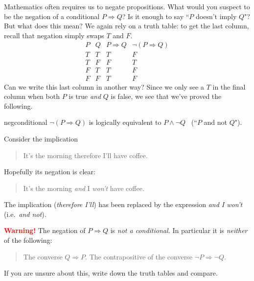  

Mathematics often requires us to negate propositions. What would you suspect to be the negation of a conditional $P\Longrightarrow Q$? Is it enough to say ``$P$ doesn't imply $Q$"? But what does this mean? We again rely on a truth table: to get the last column, recall that negation simply swaps $T$ and $F$.
\[
	\begin{array}{cc|c|c}
		P & Q & P\Longrightarrow Q & \neg(P\Longrightarrow Q)\\\hline
		T & T & T & F\\
		T & F & F & T\\
		F & T & T & F\\
		F & F & T & F
	\end{array}
\]
Can we write this last column in another way? Since we only see a $T$ in the final column when both $P$ is true \emph{and} $Q$ is false, we see that we've proved the following.

\begin{thm}{}{negconditional}
	$\neg(P\Longrightarrow Q)$ is logically equivalent to $P\wedge\neg Q$ \ (``$P$ and not $Q$").
\end{thm}


\begin{example}{}{}
	Consider the implication
	\begin{quote}
	  It's the morning therefore I'll have coffee.
	\end{quote}
	Hopefully its negation is clear:
	\begin{quote}
	  It's the morning \emph{and} I \emph{won't} have coffee.
	\end{quote}
	The implication (\emph{therefore I'll}) has been replaced by the expression \emph{and I won't} (i.e.\ \emph{and not}).
\end{example}

\begin{tcolorbox}
{\bf \textcolor{red}{Warning!}} The negation of $P\Longrightarrow Q$ is \emph{not a conditional.} In particular it is \emph{neither} of the following:
\begin{quote}
  The converse $Q\Longrightarrow P$.\smallbreak
  The contrapositive of the converse $\neg P\Longrightarrow\neg Q$. 
\end{quote}
If you are unsure about this, write down the truth tables and compare.
\end{tcolorbox}

\bigbreak


